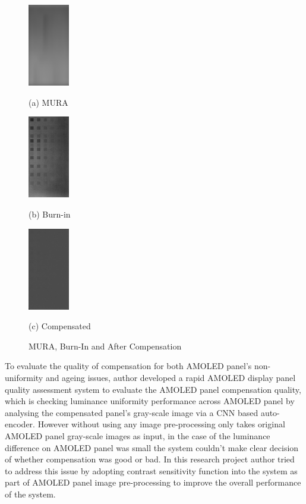 \documentclass{article}
\begin{document}
\begin{figure}[h]
\begin{minipage}[b]{.3\linewidth}
  \centering
  \centerline{\includegraphics[width=1.8cm]{images/csfed_G_480_I0_PsdLum.png}}
  \centerline{(a) MURA}\medskip
\end{minipage}
\hfill
\begin{minipage}[b]{0.3\linewidth}
  \centering
  \centerline{\includegraphics[width=1.8cm]{images/A1_G_300_I0_PsdLum.csv.png}}
  \centerline{(b) Burn-in }\medskip
\end{minipage}
%
\hfill
\begin{minipage}[b]{0.3\linewidth}
  \centering
  \centerline{\includegraphics[width=1.8cm]{images/A1_G_300_I2_PsdLum.csv.png}}
  \centerline{(c) Compensated}\medskip
\end{minipage}
%
\caption{MURA, Burn-In and After Compensation}
\label{fig1}
%
\end{figure}
To evaluate the quality of compensation for both AMOLED panel's non-uniformity and ageing issues, author developed a rapid AMOLED display panel quality assessment system to evaluate the AMOLED panel compensation quality, which is checking luminance uniformity performance across AMOLED panel by analysing the compensated panel's gray-scale image via a CNN based auto-encoder. However without using any image pre-processing only takes original AMOLED panel gray-scale images as input, in the case of the luminance difference on AMOLED panel was small the system couldn't make clear decision of whether compensation was good or bad. 
In this research project author tried to address this issue by adopting contrast sensitivity function into the system as part of AMOLED panel image pre-processing to improve the overall performance of the system. \\
\end{document}
